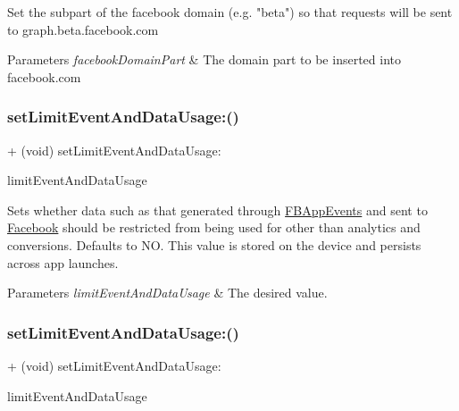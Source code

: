 Set the subpart of the facebook domain (e.\+g. "beta") so that requests will be sent to graph.\+beta.\+facebook.\+com


\begin{DoxyParams}{Parameters}
{\em facebook\+Domain\+Part} & The domain part to be inserted into facebook.\+com \\
\hline
\end{DoxyParams}
\mbox{\label{interfaceFBSettings_ab0e8e19825a865db7cbf58da4957cf40}} 
\subsubsection{\texorpdfstring{set\+Limit\+Event\+And\+Data\+Usage\+:()}{setLimitEventAndDataUsage:()}\hspace{0.1cm}{\footnotesize\ttfamily [1/5]}}
{\footnotesize\ttfamily + (void) set\+Limit\+Event\+And\+Data\+Usage\+: \begin{DoxyParamCaption}\item[{(B\+O\+OL)}]{limit\+Event\+And\+Data\+Usage }\end{DoxyParamCaption}}

Sets whether data such as that generated through \hyperlink{interfaceFBAppEvents}{F\+B\+App\+Events} and sent to \hyperlink{interfaceFacebook}{Facebook} should be restricted from being used for other than analytics and conversions. Defaults to NO. This value is stored on the device and persists across app launches.


\begin{DoxyParams}{Parameters}
{\em limit\+Event\+And\+Data\+Usage} & The desired value. \\
\hline
\end{DoxyParams}
\mbox{\label{interfaceFBSettings_ab0e8e19825a865db7cbf58da4957cf40}} 
\subsubsection{\texorpdfstring{set\+Limit\+Event\+And\+Data\+Usage\+:()}{setLimitEventAndDataUsage:()}\hspace{0.1cm}{\footnotesize\ttfamily [2/5]}}
{\footnotesize\ttfamily + (void) set\+Limit\+Event\+And\+Data\+Usage\+: \begin{DoxyParamCaption}\item[{(B\+O\+OL)}]{limit\+Event\+And\+Data\+Usage }\end{DoxyParamCaption}}

